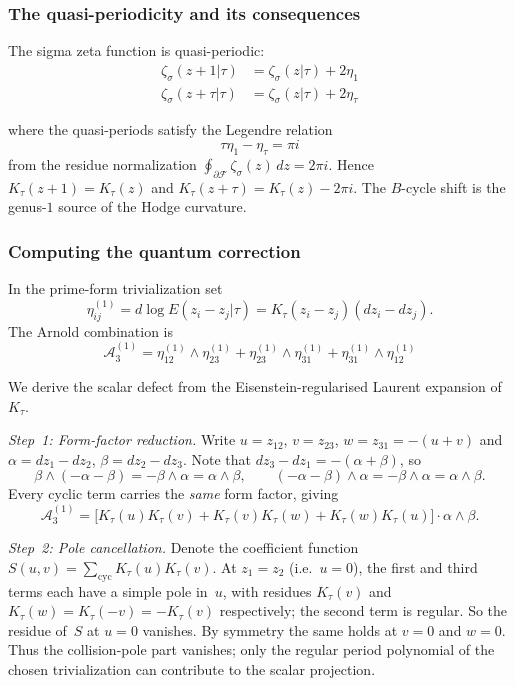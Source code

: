 \subsubsection{The quasi-periodicity and its consequences}

The sigma zeta function is quasi-periodic:
\begin{align}
\zeta_\sigma(z + 1|\tau) &= \zeta_\sigma(z|\tau) + 2\eta_1 \\
\zeta_\sigma(z + \tau|\tau) &= \zeta_\sigma(z|\tau) + 2\eta_\tau
\end{align}

where the quasi-periods satisfy the Legendre relation
\[\tau\eta_1 - \eta_\tau = \pi i\]
from the residue normalization
$\oint_{\partial\mathcal F}\zeta_\sigma(z)\,dz=2\pi i$.  Hence
$K_\tau(z+1)=K_\tau(z)$ and
$K_\tau(z+\tau)=K_\tau(z)-2\pi i$.  The $B$-cycle shift is the
genus-$1$ source of the Hodge curvature.

\subsubsection{Computing the quantum correction}

In the prime-form trivialization set
\[
\eta_{ij}^{(1)}
 = d\log E(z_i-z_j|\tau)
 = K_\tau(z_i-z_j)(dz_i-dz_j).
\]
The Arnold combination is
\[\mathcal{A}_3^{(1)} = \eta_{12}^{(1)} \wedge \eta_{23}^{(1)} + \eta_{23}^{(1)} \wedge \eta_{31}^{(1)} + \eta_{31}^{(1)} \wedge \eta_{12}^{(1)}\]

We derive the scalar defect from the Eisenstein-regularised Laurent
expansion of~$K_\tau$.

\emph{Step~1: Form-factor reduction.}
Write $u = z_{12}$, $v = z_{23}$, $w = z_{31} = -(u+v)$
and $\alpha = dz_1 - dz_2$, $\beta = dz_2 - dz_3$.
Note that $dz_3 - dz_1 = -(\alpha + \beta)$, so
\[
 \beta \wedge (-\alpha - \beta) = -\beta \wedge \alpha = \alpha \wedge \beta,
 \qquad
 (-\alpha - \beta) \wedge \alpha = -\beta \wedge \alpha = \alpha \wedge \beta.
\]
Every cyclic term carries the \emph{same} form factor, giving
\begin{equation}\label{eq:arnold-genus1-factored}
\mathcal{A}_3^{(1)}
= \bigl[K_\tau(u)K_\tau(v)
 + K_\tau(v)K_\tau(w) + K_\tau(w)K_\tau(u)\bigr]
 \cdot \alpha \wedge \beta.
\end{equation}

\emph{Step~2: Pole cancellation.}
Denote the coefficient function
$S(u,v)=\sum_{\mathrm{cyc}}K_\tau(u)K_\tau(v)$.
At $z_1 = z_2$ (i.e.\ $u = 0$), the first and third terms
each have a simple pole in~$u$, with residues $K_\tau(v)$ and
$K_\tau(w) = K_\tau(-v) = -K_\tau(v)$ respectively; the second
term is regular. So the residue of~$S$ at $u = 0$ vanishes.
By symmetry the same holds at $v = 0$ and $w = 0$.
Thus the collision-pole part vanishes; only the regular period
polynomial of the chosen trivialization can contribute to the scalar
projection.

